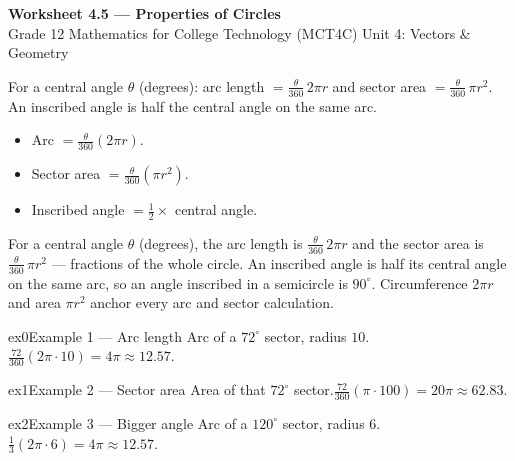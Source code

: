 \documentclass[11pt]{article}
\begin{document}
\begin{center}
{\LARGE\bfseries\color{titleblue}Worksheet 4.5 --- Properties of Circles}\\[2pt]
{\small Grade 12 Mathematics for College Technology (MCT4C) \textperiodcentered{} Unit 4: Vectors \& Geometry}
\end{center}

\begin{ideabox}
For a central angle $\theta$ (degrees): arc length $=\tfrac{\theta}{360}\,2\pi r$ and sector area $=\tfrac{\theta}{360}\,\pi r^2$. An inscribed angle is half the central angle on the same arc.
\begin{itemize}[leftmargin=*,itemsep=2pt]
  \item Arc $=\tfrac{\theta}{360}(2\pi r)$.
  \item Sector area $=\tfrac{\theta}{360}(\pi r^2)$.
  \item Inscribed angle $=\tfrac12\times$ central angle.
\end{itemize}
\end{ideabox}

\begin{learnbox}
For a central angle $\theta$ (degrees), the arc length is $\tfrac{\theta}{360}\,2\pi r$ and the sector area is $\tfrac{\theta}{360}\,\pi r^2$ — fractions of the whole circle.
An inscribed angle is half its central angle on the same arc, so an angle inscribed in a semicircle is $90^\circ$.
Circumference $2\pi r$ and area $\pi r^2$ anchor every arc and sector calculation.
\end{learnbox}


\begin{example}{ex0}{Example 1 --- Arc length}
Arc of a $72^\circ$ sector, radius $10$.\soln $\tfrac{72}{360}(2\pi\cdot10)=4\pi\approx12.57$.
\end{example}

\begin{example}{ex1}{Example 2 --- Sector area}
Area of that $72^\circ$ sector.\soln $\tfrac{72}{360}(\pi\cdot100)=20\pi\approx62.83$.
\end{example}

\begin{example}{ex2}{Example 3 --- Bigger angle}
Arc of a $120^\circ$ sector, radius $6$.\soln $\tfrac13(2\pi\cdot6)=4\pi\approx12.57$.
\end{example}
\end{document}

